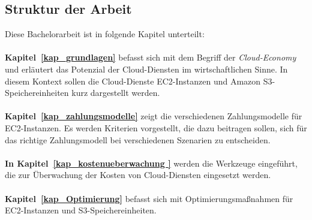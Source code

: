 \subsection{Struktur der Arbeit}


Diese Bachelorarbeit ist in folgende Kapitel unterteilt:\\\\
\textbf{Kapitel~\ref{kap_grundlagen}} 
befasst sich mit dem Begriff der \textit{Cloud-Economy} und erläutert das Potenzial der Cloud-Diensten im wirtschaftlichen Sinne. In diesem Kontext sollen die Cloud-Dienste EC2-Instanzen und Amazon S3-Speichereinheiten kurz dargestellt werden. 
\\\\
\textbf{Kapitel~\ref{kap_zahlungsmodelle}} 
zeigt die verschiedenen Zahlungsmodelle für EC2-Instanzen. Es werden Kriterien vorgestellt, die dazu beitragen sollen, sich für das richtige Zahlungsmodell bei verschiedenen Szenarien zu entscheiden. 
\\\\
\textbf{In Kapitel~\ref{kap_kostenueberwachung }} werden die Werkzeuge eingeführt, die zur Überwachung der Kosten von Cloud-Diensten eingesetzt werden.
\\\\
\textbf{Kapitel~\ref{kap_Optimierung}} befasst sich mit Optimierungsmaßnahmen %
für EC2-Instanzen und S3-Speichereinheiten.

 
